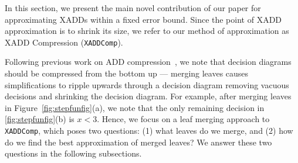 \label{sec:approx}

In this section, we present the main novel contribution of our paper
for approximating XADDs within a fixed error bound.  Since the point
of XADD approximation is to shrink its size, we refer to our method of
approximation as XADD Compression (\texttt{XADDComp}).

Following previous work on ADD compression~\cite{apricodd}, we note
that decision diagrams should be compressed from the bottom up ---
merging leaves causes simplifications to ripple upwards through a
decision diagram removing vacuous decisions and shrinking the decision
diagram.  For example, after merging leaves in
Figure~\ref{fig:stepfunfig}(a), we note that the only remaining
decision in \ref{fig:stepfunfig}(b) is $x < 3$.  Hence, we focus on a
leaf merging approach to \texttt{XADDComp}, which poses two questions:
(1) what leaves do we merge, and (2) how do we find the best
approximation of merged leaves?  We answer these two questions in the
following subsections.




